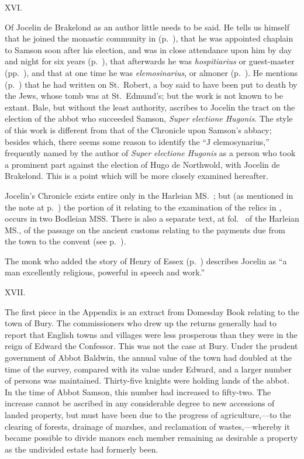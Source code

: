 \documentclass[10pt]{book}
\begin{document}
{\vspace{.3cm}
\begin{center}
XVI.
\end{center}
\noindent Of Jocelin de Brakelond as an author little needs to be said. He tells us himself that he joined the monastic community in  (p.\ ), that he was appointed chaplain to Samson soon after his election, and was in close attendance upon him by day and night for six years (p.\ ), that afterwards he was \emph{hospitiarius} or guest-master (pp.\ ), and that at one time he was \emph{elemosinarius}, or almoner (p.\ ). He mentions (p.\ ) that he had written on St.\ Robert, a boy said to have been put to death by the Jews, whose tomb was at St.\ Edmund's; but the work is not known to be extant. Bale, but without the least authority, ascribes to Jocelin the tract on the election of the abbot who succeeded Samson, \emph{Super electione Hugonis}. The style of this work is different from that of the Chronicle upon Samson's abbacy; besides which, there seems some reason to identify the ``J elemosynarius,'' frequently named by the author of \emph{Super electione Hugonis} as a person who took a prominent part against the election of Hugo de Northwold, with Jocelin de Brakelond. This is a point which will be more closely examined hereafter.

Jocelin's Chronicle exists entire only in the Harleian MS.\ ; but (as mentioned in the note at p.\ ) the portion of it relating to the examination of the relics in , occurs in two Bodleian MSS. There is also a separate text, at fol.\  of the Harleian MS., of the passage on the ancient customs relating to the payments due from the town to the convent (see p.\ ).

The monk who added the story of Henry of Essex (p.\ ) describes Jocelin as ``a man excellently religious, powerful in speech and work.''

\vspace{.3cm}
\begin{center}
XVII.
\end{center}
\noindent The first piece in the Appendix is an extract from Domesday Book relating to the town of Bury. The commissioners who drew up the returns generally had to report that English towns and villages were less prosperous than they were in the reign of Edward the Confessor. This was not the case at Bury. Under the prudent government of Abbot Baldwin, the annual value of the town had doubled at the time of the survey, compared with its value under Edward, and a larger number of persons was maintained. Thirty-five knights were holding lands of the abbot. In the time of Abbot Samson, this number had increased to fifty-two. The increase cannot be ascribed in any considerable degree to new accessions of landed property, but must have been due to the progress of agriculture,---to the clearing of forests, drainage of marshes, and reclamation of wastes,---whereby it became possible to divide manors each member remaining as desirable a property as the undivided estate had formerly been.

}
\end{document}
